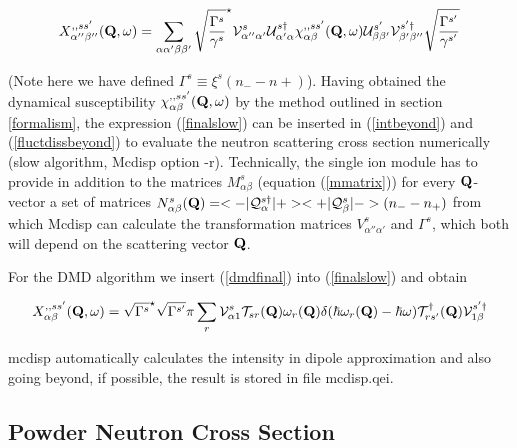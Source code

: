 \begin{equation}\label{finalslow}
X_{\alpha''\beta''}^{,,ss'}({\mathbf Q},\omega)=\sum_{\alpha\alpha'\beta\beta'}
\sqrt{\frac{\Gamma^s}{\gamma^s}}^{\star}
 \mathcal V_{\alpha''\alpha'}^{s}
  \mathcal U_{\alpha'\alpha}^{s\dag} 
    \chi_{\alpha\beta}^{,,ss'}({\mathbf Q},\omega)
  \mathcal U_{\beta\beta'}^{s'} 
 \mathcal V_{\beta'\beta''}^{s' \dag}
\sqrt{\frac{\Gamma^{s'}}{\gamma^{s'}}}
\end{equation}

(Note here we have defined $\Gamma^s \equiv \xi^s(n_--n+)$).
Having obtained the dynamical susceptibility $    \chi_{\alpha\beta}^{,,ss'}({\mathbf Q},\omega)$
by the method outlined in section \ref{formalism}, 
the expression (\ref{finalslow})
 can be inserted in (\ref{intbeyond}) and (\ref{fluctdissbeyond})  to evaluate 
the neutron scattering cross section numerically (slow algorithm, {\prg Mcdisp} option {\prg -r}).
{\small Technically, the single ion module has to provide in addition to the
matrices $M^s_{\alpha\beta}$ (equation (\ref{mmatrix})) for every $\mathbf Q$-vector
a set of matrices $N^s_{\alpha\beta}(\mathbf Q)=<-|\mathcal Q^{s \dag}_{\alpha}|+><+|\mathcal Q^s_{\beta}|-> (n_--n_+)$
from which {\prg Mcdisp} can calculate the transformation matrices 
$V_{\alpha''\alpha'}^{s}$ and $\Gamma^s$, which both will depend on the 
scattering vector $\mathbf Q$.}

For the DMD algorithm we insert  (\ref{dmdfinal}) into (\ref{finalslow}) and obtain


\begin{equation}\label{Xcalc}
X^{,,ss'}_{\alpha\beta}(\mbf Q,\omega)=\sqrt{\Gamma^s}^\star\sqrt{\Gamma^{s'}} 
\pi \sum_r 
\mathcal V^s_{\alpha1} \mathcal T_{sr}(\mbf Q)\omega_r(\mbf Q) \delta(\hbar \omega_r(\mbf Q) %
- \hbar \omega) \mathcal T^{\dag}_{rs'}(\mbf Q) \mathcal V^{s'\dag}_{1\beta}
\end{equation}

{\prg mcdisp} automatically calculates the intensity in
dipole approximation and also going beyond, if possible, the result
is stored in file {\prg mcdisp.qei}.

\subsection{Powder Neutron Cross Section}


